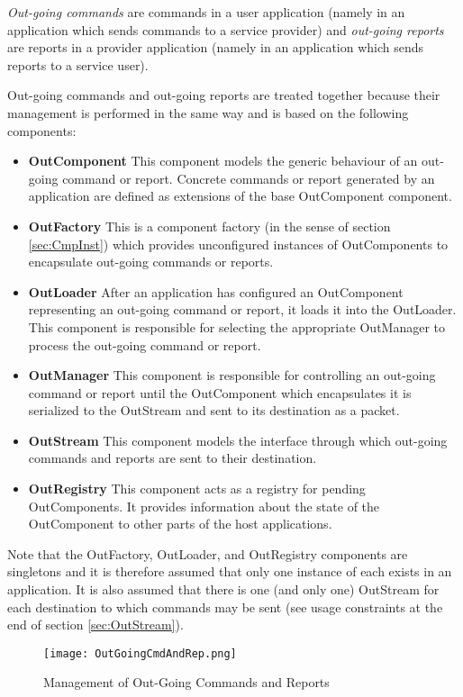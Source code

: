 \textit{Out-going commands} are commands in a user application (namely in an application which sends commands to a service provider) and \textit{out-going reports} are reports in a provider application (namely in an application which sends reports to a service user).

Out-going commands and out-going reports are treated together because their management is performed in the same way and is based on the following components:

\begin{itemize}
\item \textbf{OutComponent}
This component models the generic behaviour of an out-going command or report. Concrete commands or report generated by an application are defined as extensions of the base OutComponent component. 
\item \textbf{OutFactory}
This is a component factory (in the sense of section \ref{sec:CmpInst}) which provides unconfigured instances of OutComponents to encapsulate out-going commands or reports.
\item \textbf{OutLoader}
After an application has configured an OutComponent representing an out-going command or report, it loads it into the OutLoader. This component is responsible for selecting the appropriate OutManager to process the out-going command or report. 
\item \textbf{OutManager}
This component is responsible for controlling an out-going command or report until the OutComponent which encapsulates it is serialized to the OutStream and sent to its destination as a packet.
\item \textbf{OutStream}
This component models the interface through which out-going commands and reports are sent to their destination.
\item \textbf{OutRegistry}
This component acts as a registry for pending OutComponents. It provides information about the state of the OutComponent to other parts of the host applications. 
\end{itemize}

Note that the OutFactory, OutLoader, and OutRegistry components are singletons and it is therefore assumed that only one instance of each exists in an application. It is also assumed that there is one (and only one) OutStream for each destination to which commands may be sent (see usage constraints at the end of section \ref{sec:OutStream}).

\begin{figure}[h]
 \centering
 \texttt{[image: OutGoingCmdAndRep.png]}
 \caption{Management of Out-Going Commands and Reports}
 \label{fig:OutGoingCmdAndRep}
\end{figure}

